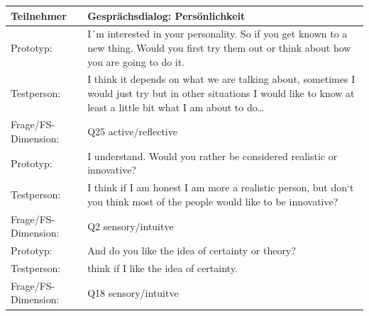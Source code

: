 \begingroup
  \footnotesize 
\begin{longtable}{|m{2.5cm}|m{12.0cm}|}
  \hline     
  \rowcolor[HTML]{EFEFEF}                                         
  \textbf{Teilnehmer} & \textbf{Gesprächsdialog: Persönlichkeit } \\ 
  \hline \hline  
  
  Prototyp: &  I´m interested in your personality.
  So if you get known to a new thing. Would you first try them out or think about how you are going to do it. \\  \hline  
Testperson: & I think it depends on what we are talking about, sometimes I would just try but in other situations
I would like to know at least a little bit what I am about to do… \\ \hline
 

Frage/FS-Dimension: & Q25 active/reflective \\ \hline
\hline 

Prototyp: & I understand. Would you rather be considered realistic or innovative?  \\  \hline  
Testperson: & I think if I am honest I am more a realistic person, but don‘t you think most of the people would like to be innovative? \\ \hline
 

Frage/FS-Dimension: & Q2 sensory/intuitve \\ \hline
\hline 

Prototyp: & And do you like the idea of certainty or theory?  \\  \hline  
Testperson: & think if I like the idea of certainty.  \\ \hline
 

Frage/FS-Dimension: & Q18 sensory/intuitve \\ \hline
\end{longtable}
\endgroup  

